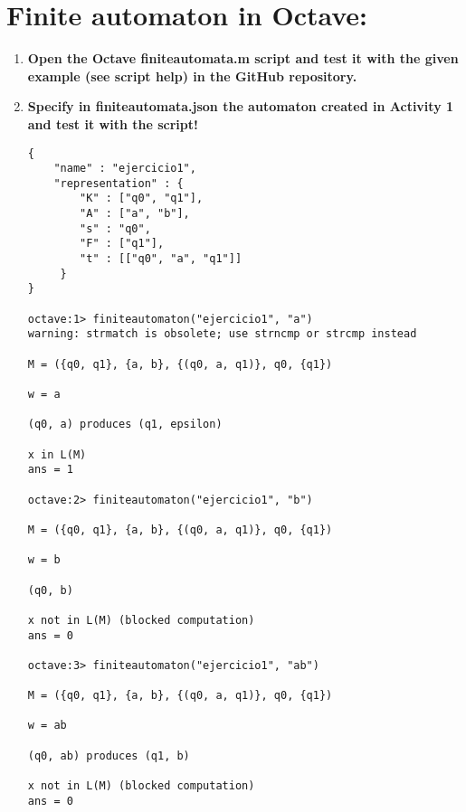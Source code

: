 \documentclass[11pt]{article}
\begin{document}
\section{Finite automaton in Octave:}
\begin{enumerate}
\item  \textbf{Open the Octave finiteautomata.m script and test it with the given example (see script help) in the GitHub repository.}
\item \textbf{Specify in finiteautomata.json the automaton created in Activity 1 and test it with the script!}
\begin{verbatim}
{
    "name" : "ejercicio1",
    "representation" : {
        "K" : ["q0", "q1"],
        "A" : ["a", "b"],
        "s" : "q0",
        "F" : ["q1"],
        "t" : [["q0", "a", "q1"]]
     }
}

octave:1> finiteautomaton("ejercicio1", "a")
warning: strmatch is obsolete; use strncmp or strcmp instead

M = ({q0, q1}, {a, b}, {(q0, a, q1)}, q0, {q1})

w = a

(q0, a) produces (q1, epsilon)

x in L(M)
ans = 1

octave:2> finiteautomaton("ejercicio1", "b")

M = ({q0, q1}, {a, b}, {(q0, a, q1)}, q0, {q1})

w = b

(q0, b)

x not in L(M) (blocked computation)
ans = 0

octave:3> finiteautomaton("ejercicio1", "ab")

M = ({q0, q1}, {a, b}, {(q0, a, q1)}, q0, {q1})

w = ab

(q0, ab) produces (q1, b)

x not in L(M) (blocked computation)
ans = 0
\end{verbatim}
\end{enumerate}
\end{document}
